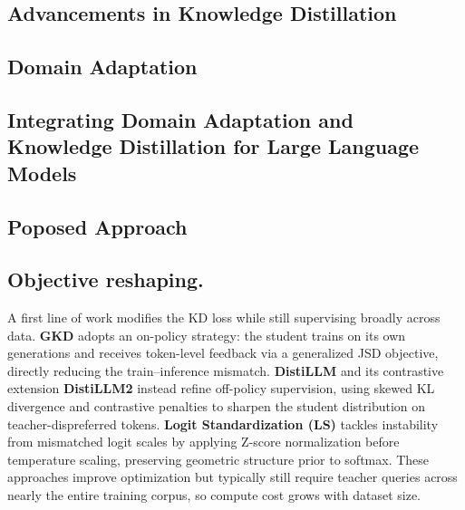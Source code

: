 \subsection{Advancements in Knowledge Distillation}
\label{subsec: advance_kd}

\subsection{Domain Adaptation}
\label{subsec: da}

\subsection{Integrating Domain Adaptation and Knowledge Distillation for Large Language Models}
\label{subsec: int}

\subsection{Poposed Approach}
\label{subsec: claim}



\subsection{Objective reshaping.}
A first line of work modifies the KD loss while still supervising broadly across data. 
\textbf{GKD} \cite{gkd} adopts an on-policy strategy: the student trains on its own generations and receives token-level feedback via a generalized JSD objective, directly reducing the train–inference mismatch. 
\textbf{DistiLLM} \cite{distillm} and its contrastive extension \textbf{DistiLLM2} \cite{ko2025distillm} instead refine off-policy supervision, using skewed KL divergence and contrastive penalties to sharpen the student distribution on teacher-dispreferred tokens. 
\textbf{Logit Standardization (LS)} \cite{ls} tackles instability from mismatched logit scales by applying Z-score normalization before temperature scaling, preserving geometric structure prior to softmax. 
These approaches improve optimization but typically still require teacher queries across nearly the entire training corpus, so compute cost grows with dataset size.

